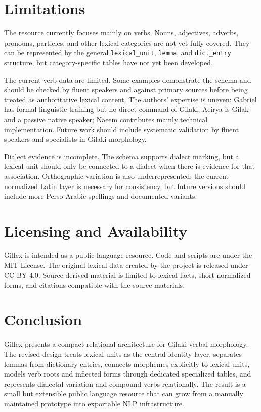 \documentclass[11pt]{article}
\newcommand{\code}[1]{\texttt{#1}}
\begin{document}
\section{Limitations}

The resource currently focuses mainly on verbs. Nouns, adjectives, adverbs, pronouns, particles, and other lexical categories are not yet fully covered. They can be represented by the general \code{lexical\_unit}, \code{lemma}, and \code{dict\_entry} structure, but category-specific tables have not yet been developed.

The current verb data are limited. Some examples demonstrate the schema and should be checked by fluent speakers and against primary sources before being treated as authoritative lexical content. The authors' expertise is uneven: Gabriel has formal linguistic training but no direct command of Gilaki; Aeirya is Gilak and a passive native speaker; Naeem contributes mainly technical implementation. Future work should include systematic validation by fluent speakers and specialists in Gilaki morphology.

Dialect evidence is incomplete. The schema supports dialect marking, but a lexical unit should only be connected to a dialect when there is evidence for that association. Orthographic variation is also underrepresented: the current normalized Latin layer is necessary for consistency, but future versions should include more Perso-Arabic spellings and documented variants.

\section{Licensing and Availability}

Gillex is intended as a public language resource. Code and scripts are under the MIT License. The original lexical data created by the project is released under CC BY 4.0. Source-derived material is limited to lexical facts, short normalized forms, and citations compatible with the source materials.

\section{Conclusion}

Gillex presents a compact relational architecture for Gilaki verbal morphology. The revised design treats lexical units as the central identity layer, separates lemmas from dictionary entries, connects morphemes explicitly to lexical units, models verb roots and inflected forms through dedicated specialized tables, and represents dialectal variation and compound verbs relationally. The result is a small but extensible public language resource that can grow from a manually maintained prototype into exportable NLP infrastructure.
\end{document}
